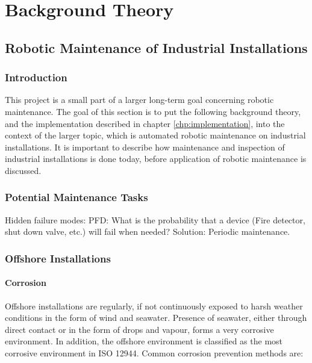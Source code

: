 \chapter{Background Theory}
\label{chp:theory} 


\section{Robotic Maintenance of Industrial Installations}

\subsection{Introduction}

This project is a small part of a larger long-term goal concerning robotic maintenance. The goal of this section is to put the following background theory, and the implementation described in chapter \ref{chp:implementation}, into the context of the larger topic, which is automated robotic maintenance on industrial installations. It is important to describe how maintenance and inspection of industrial installations is done today, before application of robotic maintenance is discussed.  

\subsection{Potential Maintenance Tasks}

Hidden failure modes: PFD: What is the probability that a device (Fire detector, shut down valve, etc.) will fail when needed? 
Solution: Periodic maintenance.

\subsection{Offshore Installations}

\subsubsection{Corrosion}

Offshore installations are regularly, if not continuously exposed to harsh weather conditions in the form of wind and seawater. Presence of seawater, either through direct contact or in the form of drops and vapour, forms a very corrosive environment. In addition, the offshore environment is classified as the most corrosive environment in ISO 12944\cite{ElReedy2012383}. Common corrosion prevention methods are\cite{ElReedy2012383}:

